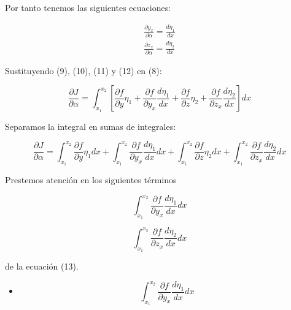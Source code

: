 \vspace*{0.5cm}


Por tanto tenemos las siguientes ecuaciones:

\begin{gather}
    \frac{\partial y_{x}}{\partial \alpha} = \frac{d \eta_{1}}{dx} \\
    \frac{\partial z_{x}}{\partial \alpha} = \frac{d \eta_{2}}{dx}
\end{gather}

\vspace*{0.5cm}

Sustituyendo (9), (10), (11) y (12) en (8):

\vspace*{0.5cm}

\begin{equation*}
    \frac{\partial J}{\partial \alpha} =
    \int_{x_{1}}^{x_{2}}
    \left[
        \frac{\partial f}{\partial y} \eta_{1}  +
        \frac{\partial f}{\partial y_{x}}  \frac{d \eta_{1}}{dx} +
        \frac{\partial f}{\partial z} \eta_{2}  +
        \frac{\partial f}{\partial z_{x}}  \frac{d \eta_{2}}{dx}
        \right]
    dx
\end{equation*}


Separamos la integral en sumas de integrales:

\vspace*{0.5cm}

\begin{equation}
    \frac{\partial J}{\partial \alpha} =
    \int_{x_{1}}^{x_{2}} \frac{\partial f}{\partial y} \eta_{1}   dx
    +\int_{x_{1}}^{x_{2}} \frac{\partial f}{\partial y_{x}}  \frac{d \eta_{1}}{dx} dx
    +\int_{x_{1}}^{x_{2}} \frac{\partial f}{\partial z} \eta_{2}  dx
    +\int_{x_{1}}^{x_{2}} \frac{\partial f}{\partial z_{x}}  \frac{d \eta_{2}}{dx} dx
\end{equation}

Prestemos atención en los siguientes términos

$$
    \int_{x_{1}}^{x_{2}} \frac{\partial f}{\partial y_{x}}  \frac{d \eta_{1}}{dx} dx
$$

$$
    \int_{x_{1}}^{x_{2}} \frac{\partial f}{\partial z_{x}}  \frac{d \eta_{2}}{dx} dx
$$

de la ecuación (13).

\vspace*{0.5cm}

\begin{itemize}
    \item $$\int_{x_{1}}^{x_{2}} \frac{\partial f}{\partial y_{x}}  \frac{d \eta_{1}}{dx} dx$$
\end{itemize}

